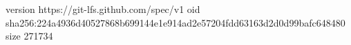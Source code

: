 version https://git-lfs.github.com/spec/v1
oid sha256:224a4936d40527868b699144e1e914ad2e57204fdd63163d2d0d99bafc648480
size 271734
